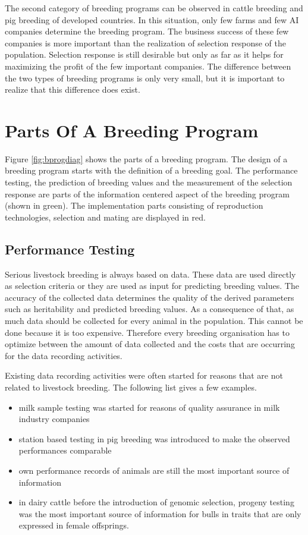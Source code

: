 \documentclass[
]{book}
\providecommand{\tightlist}{%
  \setlength{\itemsep}{0pt}\setlength{\parskip}{0pt}}
\begin{document}
The second category of breeding programs can be observed in cattle breeding and pig breeding of developed countries. In this situation, only few farms and few AI companies determine the breeding program. The business success of these few companies is more important than the realization of selection response of the population. Selection response is still desirable but only as far as it helps for maximizing the profit of the few important companies. The difference between the two types of breeding programs is only very small, but it is important to realize that this difference does exist.

\hypertarget{gel-bprog-parts}{%
\section{Parts Of A Breeding Program}\label{gel-bprog-parts}}

Figure \ref{fig:bprogdiag} shows the parts of a breeding program. The design of a breeding program starts with the definition of a breeding goal. The performance testing, the prediction of breeding values and the measurement of the selection response are parts of the information centered aspect of the breeding program (shown in green). The implementation parts consisting of reproduction technologies, selection and mating are displayed in red.

\hypertarget{gel-bprog-perftest}{%
\subsection{Performance Testing}\label{gel-bprog-perftest}}

Serious livestock breeding is always based on data. These data are used directly as selection criteria or they are used as input for predicting breeding values. The accuracy of the collected data determines the quality of the derived parameters such as heritability and predicted breeding values. As a consequence of that, as much data should be collected for every animal in the population. This cannot be done because it is too expensive. Therefore every breeding organisation has to optimize between the amount of data collected and the costs that are occurring for the data recording activities.

Existing data recording activities were often started for reasons that are not related to livestock breeding. The following list gives a few examples.

\begin{itemize}
\tightlist
\item
  milk sample testing was started for reasons of quality assurance in milk industry companies
\item
  station based testing in pig breeding was introduced to make the observed performances comparable
\item
  own performance records of animals are still the most important source of information
\item
  in dairy cattle before the introduction of genomic selection, progeny testing was the most important source of information for bulls in traits that are only expressed in female offsprings.
\end{itemize}
\end{document}
